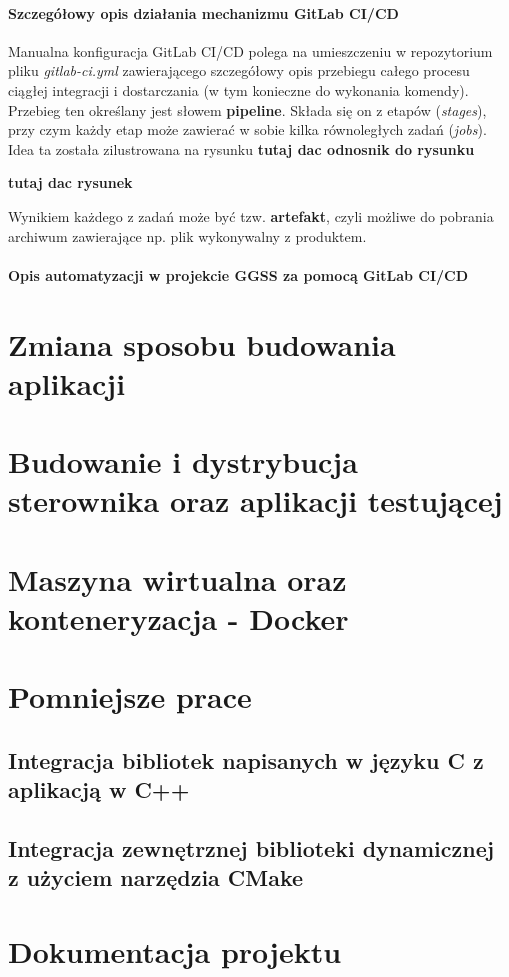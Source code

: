 \paragraph*{Szczegółowy opis działania mechanizmu GitLab CI/CD}
Manualna konfiguracja GitLab CI/CD polega na umieszczeniu w repozytorium pliku \textit{gitlab-ci.yml} zawierającego szczegółowy opis przebiegu całego procesu ciągłej integracji i dostarczania (w tym konieczne do wykonania komendy). Przebieg ten określany jest słowem \textbf{pipeline}. Składa się on z etapów (\textit{stages}), przy czym każdy etap może zawierać w sobie kilka równoległych zadań (\textit{jobs}). Idea ta została zilustrowana na rysunku \textbf{tutaj dac odnosnik do rysunku}

\textbf{tutaj dac rysunek}

Wynikiem każdego z zadań może być tzw. \textbf{artefakt}, czyli możliwe do pobrania archiwum zawierające np. plik wykonywalny z produktem. 


\paragraph*{Opis automatyzacji w projekcie GGSS za pomocą GitLab CI/CD}


\section{Zmiana sposobu budowania aplikacji}

\section{Budowanie i dystrybucja sterownika oraz aplikacji testującej}

\section{Maszyna wirtualna oraz konteneryzacja - Docker}

\section{Pomniejsze prace}
\subsection{Integracja bibliotek napisanych w języku C z aplikacją w C++}
\subsection{Integracja zewnętrznej biblioteki dynamicznej z użyciem narzędzia CMake}

\section{Dokumentacja projektu}

